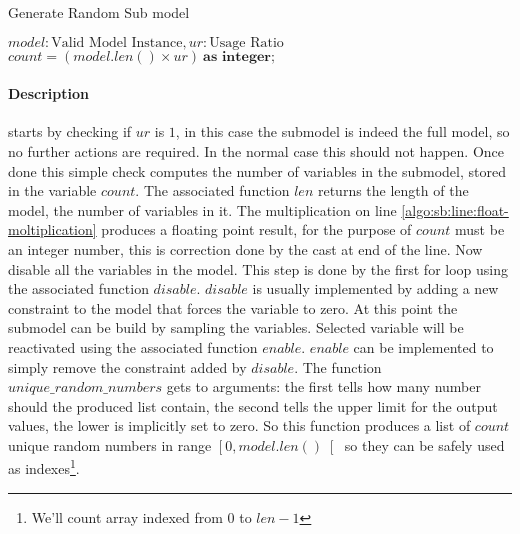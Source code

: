 \begin{algorithm}[H]
    \caption[Generate Random Sub model]{Generate Random Sub model\footnotemark}\label{algo:submodel-build}
    
    \begin{algorithmic}[1]
        \REQUIRE $model : \text{Valid Model Instance}, ur : \text{Usage Ratio}$
            \RETURN
        \ENDIF
        \STATE $count = (model.len() \times ur)\ \textbf{as integer};$ \label{algo:sb:line:float-moltiplication}
            
        \ENDFOR
        \ENDFOR
    \end{algorithmic}
\end{algorithm}



\paragraph*{Description}
     starts by checking if $ur$ is $1$, in this case the submodel is indeed the full model,
    so no further actions are required. In the normal case this should not 
    happen. Once done this simple check  computes the number of
    variables in the submodel, stored in the variable $count$.  The associated function 
    $len$ returns the length of the model, the number of variables in it. The multiplication on line \ref{algo:sb:line:float-moltiplication} 
    produces a floating point result, for the purpose of 
    $count$ must be an integer number, this is correction done by the cast at end of the line. Now  disable all the variables in the model. This step is
    done by the first for loop using the associated function $disable$. $disable$ is usually implemented by adding a new constraint to the model that
    forces the variable to zero. At this point the submodel can be build by sampling the variables. Selected variable will be reactivated using the associated function
    $enable$. $enable$ can be implemented to simply remove the constraint added by $disable$.
    The function $unique\_random\_numbers$ gets to arguments: the first tells how many number should the produced list contain, the second tells the upper limit for the output values,
    the lower is implicitly set to zero. So this function 
    produces a list of $count$ unique random numbers in range $\left[0, model.len()\right[$ so they can be safely used as indexes\footnote{We'll count array indexed from $0$ to $len - 1$}. 

